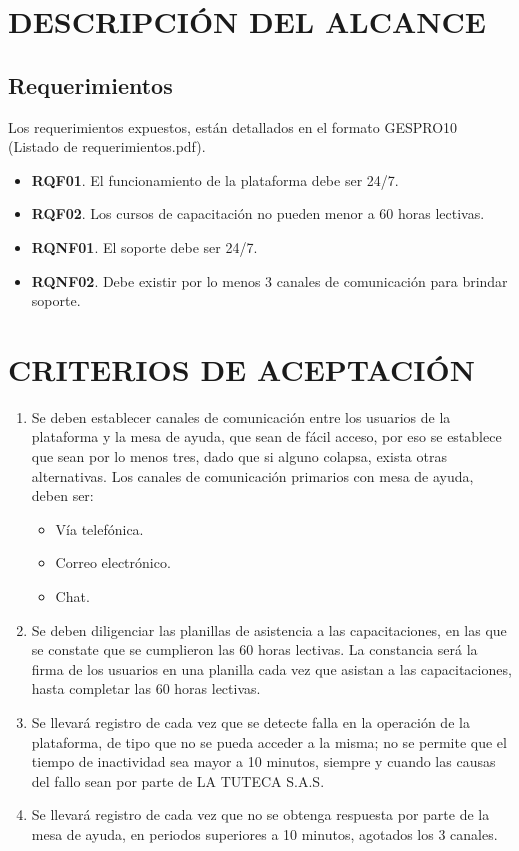\chapter{DESCRIPCI\'ON DEL ALCANCE}
%
\section{Requerimientos}
%
Los requerimientos expuestos, est\'an detallados en el formato GESPRO10 (Listado de requerimientos.pdf).
%
\begin{itemize}
	\item \textbf{RQF01}. El funcionamiento de la plataforma debe ser 24/7.
	\item \textbf{RQF02}. Los cursos de capacitaci\'on no pueden menor a 60 horas lectivas.
	\item \textbf{RQNF01}. El soporte debe ser 24/7.
	\item \textbf{RQNF02}. Debe existir por lo menos 3 canales de comunicaci\'on para brindar soporte.
\end{itemize}
%
\chapter{CRITERIOS DE ACEPTACI\'ON}
%
\begin{enumerate}
	\item Se deben establecer canales de comunicaci\'on entre los usuarios de la plataforma
		y la mesa de ayuda, que sean de f\'acil acceso, por eso se establece que sean por lo menos
		tres, dado que si alguno colapsa, exista otras alternativas. Los canales de comunicaci\'on 
		primarios con mesa de ayuda, deben ser:%
		
		\begin{itemize}
			\item V\'ia telef\'onica.
			\item Correo electr\'onico.
			\item Chat.
		\end{itemize}
	
	\item Se deben diligenciar las planillas de asistencia a las capacitaciones, en las que se constate
		que se cumplieron las 60 horas lectivas. La constancia ser\'a la firma de los usuarios en una planilla
		cada vez que asistan a las capacitaciones, hasta completar las 60 horas lectivas.
		
	\item Se llevar\'a registro de cada vez que se detecte falla en la operaci\'on de la plataforma, de tipo
		que no se pueda acceder a la misma; no se permite que el tiempo de inactividad sea mayor a 10 minutos,
		siempre y cuando las causas del fallo sean por parte de LA TUTECA S.A.S.
		
	\item Se llevar\'a registro de cada vez que no se obtenga respuesta por parte de la mesa de ayuda, en
		periodos superiores a 10 minutos, agotados los 3 canales.
\end{enumerate}
%
